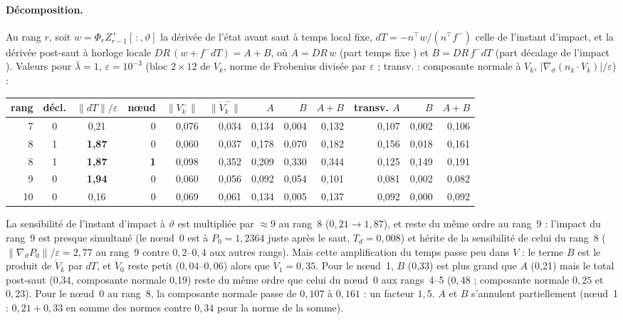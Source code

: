 \documentclass[11pt,a4paper]{article}
\theoremstyle{remark}
\newcommand{\vth}{\vartheta}
\begin{document}
\paragraph{D\'ecomposition.} Au rang $r$, soit $w=\Phi_rZ_{r-1}^+[\,:,\vth]$ la d\'eriv\'ee de l'\'etat avant saut \`a temps local fixe, $dT=-n^\top w/(n^\top f^-)$ celle de l'instant d'impact, et la d\'eriv\'ee post-saut \`a horloge locale $DR\,(w+f^-dT)=A+B$, o\`u $A=DR\,w$ (part \og temps fixe \fg) et $B=DR\,f^-dT$ (part \og d\'ecalage de l'impact \fg). Valeurs pour $\bar\lambda=1$, $\varepsilon=10^{-3}$ (bloc $2\times12$ de $V_k$, norme de Frobenius divis\'ee par $\varepsilon$ ; \og transv. \fg{} : composante normale \`a $V_k$, $\lvert\nabla_\vth(n_k\!\cdot V_k)\rvert/\varepsilon$) :
\begin{center}\small
\begin{tabular}{rcc|rrr|rrr|rrr}
\toprule
rang & d\'ecl. & $\lVert dT\rVert/\varepsilon$ & n\oe ud & $\lVert V_k^-\rVert$ & $\lVert\dot V_k^-\rVert$ & $A$ & $B$ & $A{+}B$ & transv. $A$ & $B$ & $A{+}B$\\
\midrule
7 & 0 & 0,21 & 0 & 0,076 & 0,034 & 0,134 & 0,004 & 0,132 & 0,107 & 0,002 & 0,106\\
8 & 1 & \textbf{1,87} & 0 & 0,060 & 0,037 & 0,178 & 0,070 & 0,182 & 0,156 & 0,018 & 0,161\\
8 & 1 & \textbf{1,87} & \textbf{1} & 0,098 & 0,352 & 0,209 & 0,330 & 0,344 & 0,125 & 0,149 & 0,191\\
9 & 0 & \textbf{1,94} & 0 & 0,060 & 0,056 & 0,092 & 0,054 & 0,101 & 0,081 & 0,002 & 0,082\\
10 & 0 & 0,16 & 0 & 0,069 & 0,061 & 0,134 & 0,005 & 0,137 & 0,092 & 0,000 & 0,092\\
\bottomrule
\end{tabular}
\end{center}
La sensibilit\'e de l'instant d'impact \`a $\vth$ est multipli\'ee par $\approx9$ au rang~8 ($0{,}21\to1{,}87$), et reste du m\^eme ordre au rang~9 : l'impact du rang~9 est presque simultan\'e (le n\oe ud~0 est \`a $P_0=1{,}2364$ juste apr\`es le saut, $T_d=0{,}008$) et h\'erite de la sensibilit\'e de celui du rang~8 ($\lVert\nabla_\vth P_0\rVert/\varepsilon=2{,}77$ au rang~9 contre $0{,}2$--$0{,}4$ aux autres rangs). Mais cette amplification du temps passe peu dans $V$ : le terme $B$ est le produit de $\dot V_k$ par $dT$, et $\dot V_0$ reste petit ($0{,}04$--$0{,}06$) alors que $\dot V_1=0{,}35$. Pour le n\oe ud~1, $B$ (0,33) est plus grand que $A$ (0,21) mais le total post-saut (0,34, composante normale 0,19) reste du m\^eme ordre que celui du n\oe ud~0 aux rangs~4--5 ($0{,}48$ ; composante normale $0{,}25$ et $0{,}23$). Pour le n\oe ud~0 au rang~8, la composante normale passe de $0{,}107$ \`a $0{,}161$ : un facteur $1{,}5$. $A$ et $B$ s'annulent partiellement (n\oe ud~1 : $0{,}21+0{,}33$ en somme des normes contre $0{,}34$ pour la norme de la somme).
\end{document}
